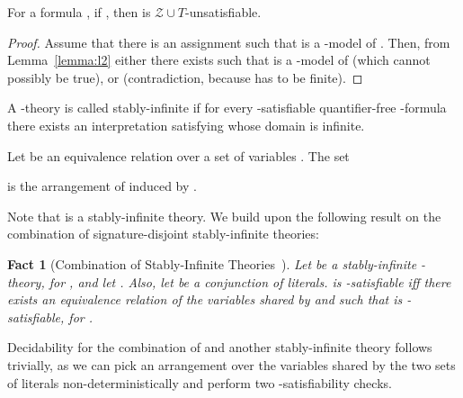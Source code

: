 \documentclass{llncs}
\newcommand{\ZT}[0]{\ensuremath{\mathcal{Z} \cup T}}
\newtheorem{fact}{Fact}
\begin{document}
\begin{theorem}
  \label{thm:sound-unsat}
  For a formula , if , then  is \ZT{}-unsatisfiable.
\end{theorem}
\begin{proof}
  Assume that there is an assignment  such that  is a -model
  of . Then, from Lemma~\ref{lemma:l2} either there exists
   such that  is a -model of  (which cannot possibly be true), or  (contradiction, because  has to
  be finite).
\end{proof}

\begin{definition}
  A -theory  is called stably-infinite if for every
   -satisfiable quantifier-free -formula  there exists an
   interpretation satisfying  whose domain is infinite.
 \end{definition}

 \begin{definition}[Arrangement]
   Let  be an equivalence relation over a set of variables . The
   set
   
   is the arrangement of  induced by .
\end{definition}

Note that  is a stably-infinite theory. We build upon the
following result on the combination of signature-disjoint
stably-infinite theories:

\begin{fact}[Combination of Stably-Infinite
  Theories~\cite{no79,noproof,combiningdp}]
  Let  be a stably-infinite -theory, for ,
  and let . Also, let 
  be a conjunction of  literals.  is
  -satisfiable iff there exists an equivalence
  relation  of the variables shared by  and 
  such that  is -satisfiable, for .
  \label{thm:no}
\end{fact}

Decidability for the combination of  and another
stably-infinite theory follows trivially, as we can pick an
arrangement over the variables shared by the two sets of literals
non-deterministically and perform two -satisfiability checks.
\end{document}
